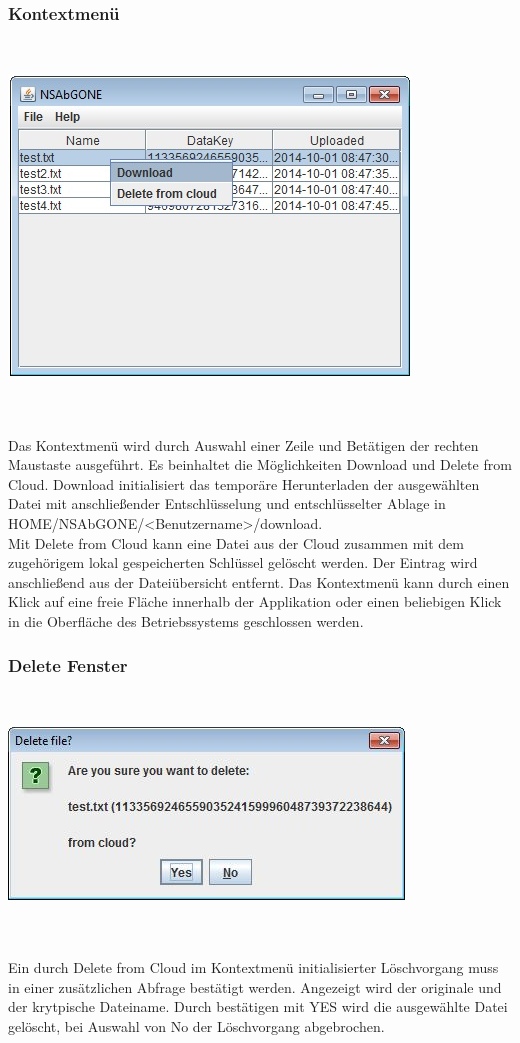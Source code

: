 \documentclass[13pt,a4paper,bibliography=totocnumbered,listof=totocnumbered]{scrartcl}
\begin{document}
\subsubsection{Kontextmenü}
$\;$\\
\begin{minipage}{\linewidth}
	\centering
	\includegraphics[width=0.4\linewidth]{./img/Kontext.jpg}
	\label{Kontext}
\end{minipage}
\\\\Das Kontextmenü wird durch Auswahl einer Zeile und Betätigen der rechten Maustaste ausgeführt. Es beinhaltet die Möglichkeiten Download und Delete from Cloud. Download initialisiert das temporäre Herunterladen der ausgewählten Datei mit anschließender Entschlüsselung und entschlüsselter Ablage in\\ 
HOME/NSAbGONE/\textless Benutzername\textgreater/download.\\ Mit Delete from Cloud kann eine Datei aus der Cloud zusammen mit dem zugehörigem lokal gespeicherten Schlüssel gelöscht werden. Der Eintrag wird anschließend aus der Dateiübersicht entfernt. Das Kontextmenü kann durch einen Klick auf eine freie Fläche innerhalb der Applikation oder einen beliebigen Klick in die Oberfläche des Betriebssystems geschlossen werden.

\subsubsection{Delete Fenster}
$\;$\\
\begin{minipage}{\linewidth}
	\centering
	\includegraphics[width=0.4\linewidth]{./img/Delete.jpg}
	\label{Delete}
\end{minipage}
\\\\Ein durch Delete from Cloud im Kontextmenü initialisierter Löschvorgang muss in einer zusätzlichen Abfrage bestätigt werden. Angezeigt wird der originale und der krytpische Dateiname. Durch bestätigen mit YES wird die ausgewählte Datei gelöscht, bei Auswahl von No der Löschvorgang abgebrochen.
\end{document}
